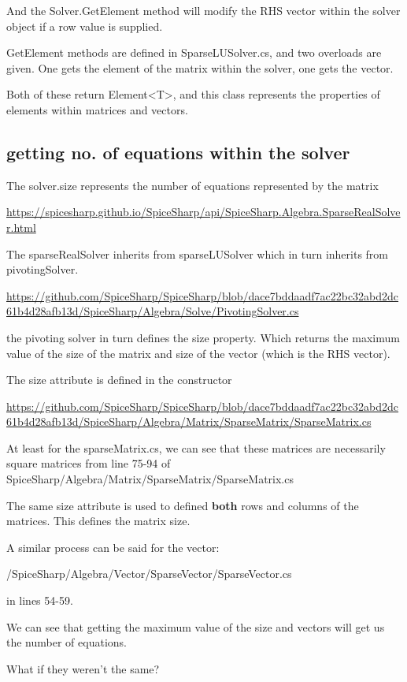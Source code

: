 \documentclass[12pt]{article}
\renewcommand{\_}{\kern-1.5pt\textunderscore\kern-1.5pt}
\begin{document}
And the Solver.GetElement method will modify the RHS vector within the solver object if a row value is supplied.

GetElement methods are defined in SparseLUSolver.cs, and two overloads are given. One gets the element of the matrix within the solver, one gets the vector.

Both of these return Element<T>, and this class represents the properties of elements within matrices and vectors.

\subsection{getting no. of equations within the solver}

The solver.size represents the number of equations represented by the matrix

\url{https://spicesharp.github.io/SpiceSharp/api/SpiceSharp.Algebra.SparseRealSolver.html}

The sparseRealSolver inherits from sparseLUSolver which in turn inherits from pivotingSolver.

\url{https://github.com/SpiceSharp/SpiceSharp/blob/dace7bddaadf7ac22bc32abd2dc61b4d28afb13d/SpiceSharp/Algebra/Solve/PivotingSolver.cs}

the pivoting solver in turn defines the size property. Which returns the maximum value of the size of the matrix and size of the vector (which is the RHS vector).

The size attribute is defined in the constructor

\url{https://github.com/SpiceSharp/SpiceSharp/blob/dace7bddaadf7ac22bc32abd2dc61b4d28afb13d/SpiceSharp/Algebra/Matrix/SparseMatrix/SparseMatrix.cs}

At least for the sparseMatrix.cs, we can see that these matrices are necessarily square matrices from line 75-94 of SpiceSharp/Algebra/Matrix/SparseMatrix/SparseMatrix.cs

The same size attribute is used to defined \textbf{both} rows and columns of the matrices. This defines the matrix size.

A similar process can be said for the vector:

/SpiceSharp/Algebra/Vector/SparseVector/SparseVector.cs

in lines 54-59.

We can see that getting the maximum value of the size and vectors will get us the number of equations.

What if they weren't the same?
\end{document}
